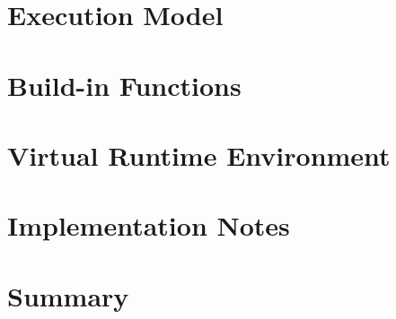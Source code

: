 \documentclass[a4paper, 11.5pt]{article}
\begin{document}
\begin{multicols}{2}
  \section{Execution Model}

  \section{Build-in Functions}

  \section{Virtual Runtime Environment}

  \section{Implementation Notes}

  \section{Summary}

\end{multicols}
\end{document}
